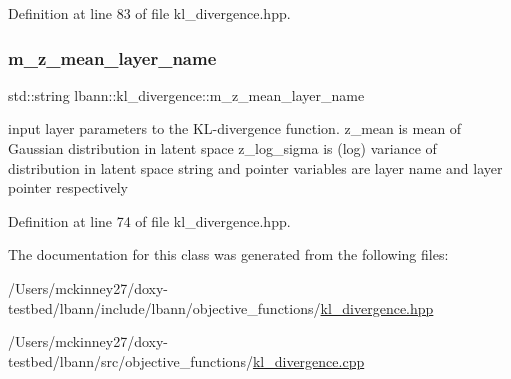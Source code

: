 Definition at line 83 of file kl\+\_\+divergence.\+hpp.

\mbox{\label{classlbann_1_1kl__divergence_ad9faebef778e49a01c094917bc5e72ed}} 
\subsubsection{\texorpdfstring{m\+\_\+z\+\_\+mean\+\_\+layer\+\_\+name}{m\_z\_mean\_layer\_name}}
{\footnotesize\ttfamily std\+::string lbann\+::kl\+\_\+divergence\+::m\+\_\+z\+\_\+mean\+\_\+layer\+\_\+name\hspace{0.3cm}{\ttfamily [protected]}}

input layer parameters to the K\+L-\/divergence function. z\+\_\+mean is mean of Gaussian distribution in latent space z\+\_\+log\+\_\+sigma is (log) variance of distribution in latent space string and pointer variables are layer name and layer pointer respectively 

Definition at line 74 of file kl\+\_\+divergence.\+hpp.



The documentation for this class was generated from the following files\+:\begin{DoxyCompactItemize}
\item 
/\+Users/mckinney27/doxy-\/testbed/lbann/include/lbann/objective\+\_\+functions/\hyperlink{kl__divergence_8hpp}{kl\+\_\+divergence.\+hpp}\item 
/\+Users/mckinney27/doxy-\/testbed/lbann/src/objective\+\_\+functions/\hyperlink{kl__divergence_8cpp}{kl\+\_\+divergence.\+cpp}\end{DoxyCompactItemize}
